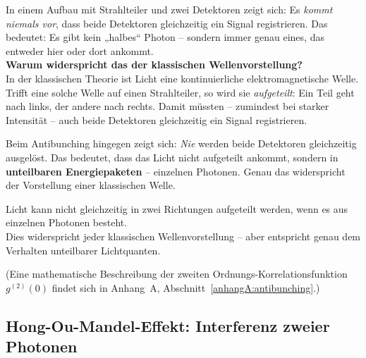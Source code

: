 In einem Aufbau mit Strahlteiler und zwei Detektoren zeigt sich: Es \emph{kommt niemals vor}, dass beide Detektoren gleichzeitig ein Signal registrieren. Das bedeutet: Es gibt kein „halbes“ Photon – sondern immer genau eines, das entweder hier oder dort ankommt.\\
\textbf{Warum widerspricht das der klassischen Wellenvorstellung?} \\
In der klassischen Theorie ist Licht eine kontinuierliche elektromagnetische Welle. Trifft eine solche Welle auf einen Strahlteiler, so wird sie \emph{aufgeteilt}: Ein Teil geht nach links, der andere nach rechts. Damit müssten – zumindest bei starker Intensität – auch beide Detektoren gleichzeitig ein Signal registrieren.

Beim Antibunching hingegen zeigt sich: \emph{Nie} werden beide Detektoren gleichzeitig ausgelöst. Das bedeutet, dass das Licht nicht aufgeteilt ankommt, sondern in \textbf{unteilbaren Energiepaketen} – einzelnen Photonen. Genau das widerspricht der Vorstellung einer klassischen Welle.

\medskip
\begin{tcolorbox}[physikbox, title=Was Antibunching zeigt]
	\label{box:wasAntibunching}
	\small
	Licht kann nicht gleichzeitig in zwei Richtungen aufgeteilt werden, wenn es aus einzelnen Photonen besteht.\\
	Dies widerspricht jeder klassischen Wellenvorstellung – aber entspricht genau dem Verhalten unteilbarer Lichtquanten.
\end{tcolorbox}
\medskip
(Eine mathematische Beschreibung der zweiten Ordnungs-Korrelations\-funktion \( g^{(2)}(0) \) findet sich in Anhang~A, Abschnitt~\ref{anhangA:antibunching}.) %
\subsection{Hong-Ou-Mandel-Effekt:  Interferenz zweier Photonen}

